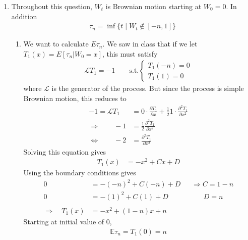 \documentclass[12pt]{article}
\theoremstyle{plain}
\theoremstyle{definition}
\theoremstyle{remark}
\begin{document}
\begin{enumerate}
  \item %
    Throughout this question, $W_t$ is Brownian motion starting at
    $W_0=0$. In addition
    \begin{align*}
      \tau_n = \inf \{t \; | \; W_t \not\in [-n,1]\}
    \end{align*}
    \begin{enumerate}
      \item %
        We want to calculate $E\tau_n$. We saw in class that if we let
        $T_1(x) = E[\tau_n | W_0=x]$, this must satisfy
        \begin{align*}
          \mathscr{L}T_1 = -1
          \qquad \text{s.t.}
          \begin{cases}
            T_1(-n) = 0 \\
            T_1(1)=0
          \end{cases}
        \end{align*}
        where $\mathscr{L}$ is the generator of the process. But since
        the process is simple Brownian motion, this reduces to
        \begin{align*}
          -1 = \mathscr{L}T_1
          &= 0 \cdot \frac{\partial T_1}{\partial x}
          + \frac{1}{2} 1\cdot \frac{\partial^2 T_1}{\partial x^2}\\
          \Rightarrow\qquad
          -1 &= \frac{1}{2} \frac{\partial^2 T_1}{\partial x^2}\\
          \Leftrightarrow\qquad
          -2 &= \frac{\partial^2 T_1}{\partial x^2}
        \end{align*}
        Solving this equation gives
        \begin{align*}
          T_1(x) &= -x^2 + Cx + D
        \end{align*}
        Using the boundary conditions gives
        \begin{align*}
          0 &= -(-n)^2 + C(-n) + D
          \;\;\quad \Rightarrow
          C = 1-n\\
          0 &= -(1)^2 + C(1) + D \quad\qquad\qquad
          D = n\\\\
          \Rightarrow \quad
          T_1(x) &= -x^2 + (1-n)x + n
        \end{align*}
        Starting at initial value of 0,
        \begin{align*}
          \mathbb{E}\tau_n = T_1(0) = n
        \end{align*}


\end{enumerate}
\end{enumerate}
\end{document}
